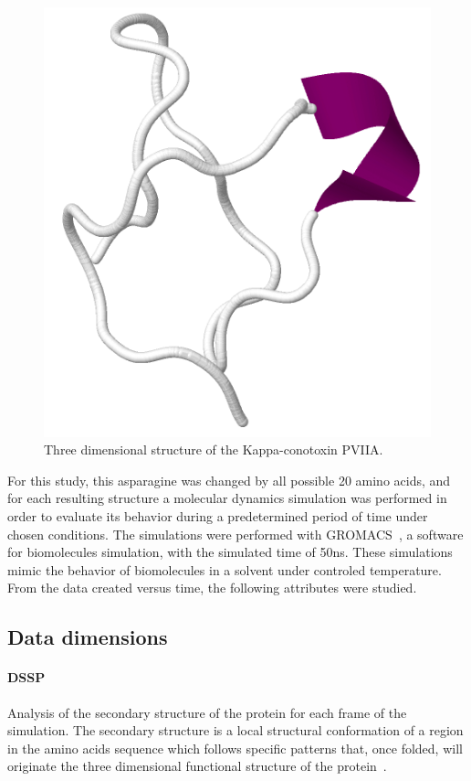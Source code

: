 \documentclass[10pt, conference]{IEEEtran}
\begin{document}
\begin{figure}
\includegraphics[width=0.7\linewidth]{figs/pviia.png}
\caption{Three dimensional structure of the Kappa-conotoxin PVIIA.} 
\label{fig:pviia}
\end{figure}

For this study, this asparagine was changed by all possible 20 amino acids, and for each resulting structure a molecular dynamics simulation was performed in order to evaluate its behavior during a predetermined period of time under chosen conditions. The simulations were performed with GROMACS~\cite{hess2008gromacs}, a software for biomolecules simulation, with the simulated time of 50ns. These simulations mimic the behavior of biomolecules in a solvent under controled temperature. From the data created versus time, the following attributes were studied.

\subsection{Data dimensions}

\paragraph*{DSSP} Analysis of the secondary structure of the protein for each frame of the simulation. The secondary structure is a local structural conformation of a region in the amino acids sequence which follows specific patterns that, once folded, will originate the three dimensional functional structure of the protein~\cite{kabsch1983dictionary}. 
%
\end{document}
